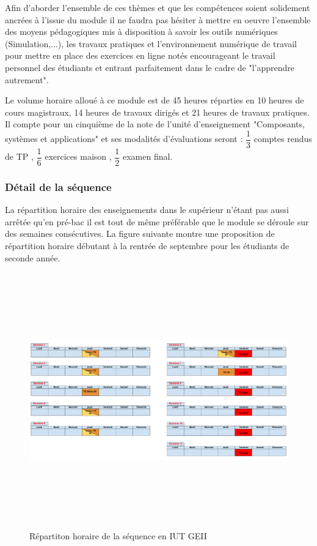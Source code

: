 \documentclass[12pt]{article}
\begin{document}
\vspace{10pt}

Afin d'aborder l'ensemble de ces thèmes et que les compétences soient solidement ancrées à l'issue du module il ne faudra pas hésiter à mettre en oeuvre l'ensemble des moyens pédagogiques mis à disposition à savoir les outils numériques (Simulation,...), les travaux pratiques et l'environnement numérique de travail pour mettre en place des exercices en ligne notés encourageant le travail personnel des étudiants et entrant parfaitement dans le cadre de "l'apprendre autrement".\par
\vspace{10pt}

Le volume horaire alloué à ce module est de 45 heures réparties en 10 heures de cours magistraux, 14 heures de travaux dirigés et 21 heures de travaux pratiques. Il compte pour un cinquième de la note de l'unité d'enseignement "Composants, systèmes et applications" et ses modalités d'évaluations seront : $\dfrac{1}{3}$ comptes rendus de TP , $\dfrac{1}{6}$ exercices maison , $\dfrac{1}{2}$ examen final.

\newpage

\subsubsection{Détail de la séquence}

La répartition horaire des enseignements dans le supérieur n'étant pas aussi arrêtée qu'en pré-bac il est tout de même préférable que le module se déroule sur des semaines consécutives. La figure suivante montre une proposition de répartition horaire débutant à la rentrée de septembre pour les étudiants de seconde année.\par
\vspace{10pt}


\begin{figure}[!h]
\hspace{-50pt}
\includegraphics[width=20cm,height=11cm,trim=0cm 0cm 0cm 0cm, clip=true]{Images_Rapport/horaires_geii}
\caption{Répartiton horaire de la séquence en IUT GEII}
\end{figure}
\end{document}
